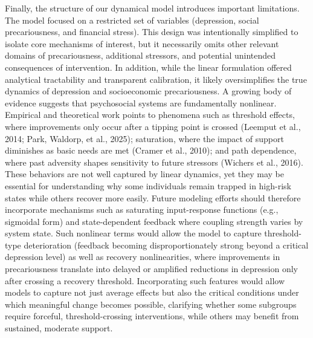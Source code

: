 \documentclass[
]{article}
\begin{document}
Finally, the structure of our dynamical model introduces important
limitations. The model focused on a restricted set of variables
(depression, social precariousness, and financial stress). This design
was intentionally simplified to isolate core mechanisms of interest, but
it necessarily omits other relevant domains of precariousness,
additional stressors, and potential unintended consequences of
intervention. In addition, while the linear formulation offered
analytical tractability and transparent calibration, it likely
oversimplifies the true dynamics of depression and socioeconomic
precariousness.
\textcolor{BrickRed}{A growing body of evidence suggests that psychosocial systems are fundamentally nonlinear. Empirical and theoretical work points to phenomena such as threshold effects, where improvements only occur after a tipping point is crossed}
(Leemput et al., 2014; Park, Waldorp, et al., 2025);
\textcolor{BrickRed}{saturation, where the impact of support diminishes as basic needs are met}
(Cramer et al., 2010);
\textcolor{BrickRed}{and path dependence, where past adversity shapes sensitivity to future stressors}
(Wichers et al., 2016).
\textcolor{BrickRed}{These behaviors are not well captured by linear dynamics, yet they may be essential for understanding why some individuals remain trapped in high-risk states while others recover more easily. Future modeling efforts should therefore incorporate mechanisms such as saturating input-response functions (e.g., sigmoidal form) and state-dependent feedback where coupling strength varies by system state. Such nonlinear terms would allow the model to capture threshold-type deterioration (feedback becoming disproportionately strong beyond a critical depression level) as well as recovery nonlinearities, where improvements in precariousness translate into delayed or amplified reductions in depression only after crossing a recovery threshold. Incorporating such features would allow models to capture not just average effects but also the critical conditions under which meaningful change becomes possible, clarifying whether some subgroups require forceful, threshold-crossing interventions, while others may benefit from sustained, moderate support.}
\end{document}
